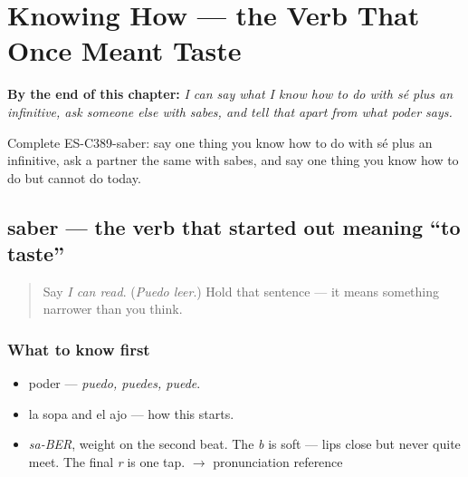 
\chapter{Knowing How --- the Verb That Once Meant Taste}
\label{ch:saber}

\begin{chapteropening}
\textbf{By the end of this chapter:} \emph{I can say what I know how to do with sé plus an infinitive, ask someone else with sabes, and tell that apart from what poder says.}

Complete ES-C389-saber: say one thing you know how to do with sé plus an infinitive, ask a partner the same with sabes, and say one thing you know how to do but cannot do today.
\end{chapteropening}

\section[saber]{saber — the verb that started out meaning \textquotedblleft{}to taste\textquotedblright{}}

\label{lesson:ES-C389-saber}



\begin{quote}
Say \emph{I can read}. (\emph{Puedo leer}.) Hold that sentence — it means something narrower than you think.
\end{quote}

\subsection*{What to know first}
\begin{itemize}
\raggedright
  \item poder — \emph{puedo, puedes, puede}.
  \item la sopa and el ajo — how this starts.
\end{itemize}

\begin{sounds}
\begin{itemize}
\raggedright
  \item \emph{sa-BER}, weight on the second beat. The \emph{b} is soft — lips close but never quite meet. The final \emph{r} is one tap. $\to$ pronunciation reference
\end{itemize}
\end{sounds}

